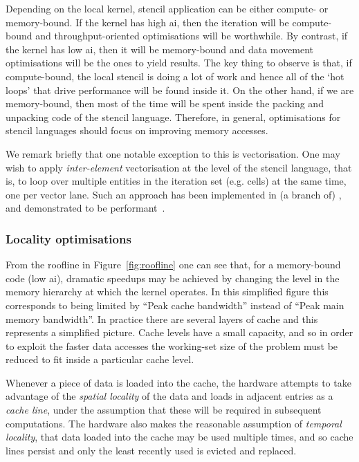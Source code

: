 Depending on the local kernel, stencil application can be either compute- or memory-bound.
If the kernel has high \gls{ai}, then the iteration will be compute-bound and throughput-oriented optimisations will be worthwhile.
By contrast, if the kernel has low \gls{ai}, then it will be memory-bound and data movement optimisations will be the ones to yield results.
The key thing to observe is that, if compute-bound, the local stencil is doing a lot of work and hence all of the `hot loops' that drive performance will be found inside it.
On the other hand, if we are memory-bound, then most of the time will be spent inside the packing and unpacking code of the stencil language.
Therefore, in general, optimisations for stencil languages should focus on improving memory accesses.

We remark briefly that one notable exception to this is vectorisation.
One may wish to apply \textit{inter-element} vectorisation at the level of the stencil language, that is, to loop over multiple entities in the iteration set (e.g. cells) at the same time, one per vector lane.
Such an approach has been implemented in (a branch of) , and demonstrated to be performant~\cite{sunStudyVectorizationMatrixfree2020}.

\subsubsection{Locality optimisations}
\label{sec:background_opt_locality}

From the roofline in Figure~\ref{fig:roofline} one can see that, for a memory-bound code (low \gls{ai}), dramatic speedups may be achieved by changing the level in the memory hierarchy at which the kernel operates.
In this simplified figure this corresponds to being limited by ``Peak cache bandwidth'' instead of ``Peak main memory bandwidth''.
In practice there are several layers of cache and this represents a simplified picture.
Cache levels have a small capacity, and so in order to exploit the faster data accesses the working-set size of the problem must be reduced to fit inside a particular cache level.

Whenever a piece of data is loaded into the cache, the hardware attempts to take advantage of the \textit{spatial locality} of the data and loads in adjacent entries as a \textit{cache line}, under the assumption that these will be required in subsequent computations.
The hardware also makes the reasonable assumption of \textit{temporal locality}, that data loaded into the cache may be used multiple times, and so cache lines persist and only the least recently used is evicted and replaced.

